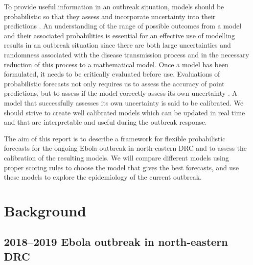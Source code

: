 \documentclass[12pt]{article}
\begin{document}
To provide useful information in an outbreak situation, models should be probabilistic so that they assess and incorporate uncertainty into their predictions \cite{funkAssessingPerformanceRealtime2019, weiCalibrationTestsCount2014,heldProbabilisticForecastingInfectious2017,gneitingEditorialProbabilisticForecasting2008}. An understanding of the range of possible outcomes from a model and their associated probabilities is essential for an effective use of modelling results in an outbreak situation since there are both large uncertainties and randomness associated with the disease transmission process and in the necessary reduction of this process to a mathematical model. Once a model has been formulated, it needs to be critically evaluated before use. Evaluations of probabilistic forecasts not only requires us to assess the accuracy of point predictions, but to assess if the model correctly assess its own uncertainty \cite{gneitingProbabilisticForecastsCalibration2007, czadoPredictiveModelAssessment2009}. A model that successfully assesses its own uncertainty is said to be calibrated. We should strive to create well calibrated models which can be updated in real time and that are interpretable and useful during the outbreak response. 

The aim of this report is to describe a framework for flexible probabilistic forecasts for the ongoing Ebola outbreak in north-eastern DRC and to assess the calibration of the resulting models. We will compare different models using proper scoring rules to choose the model that gives the best forecasts, and use these models to explore the epidemiology of the current outbreak. 

\section{Background}
\subsection{2018--2019 Ebola outbreak in north-eastern DRC}
\end{document}
